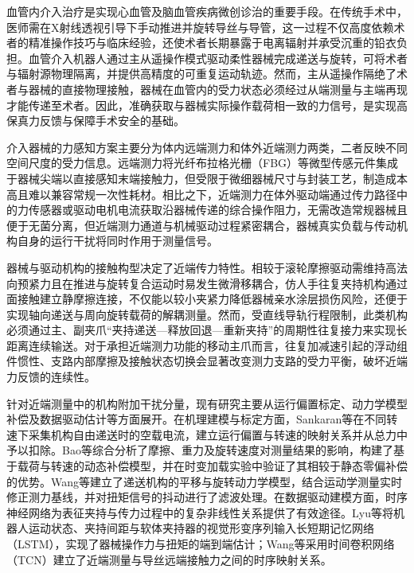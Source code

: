 \documentclass{JQRnew}
\begin{document}
\maketitle

血管内介入治疗是实现心血管及脑血管疾病微创诊治的重要手段。在传统手术中，医师需在X射线透视引导下手动推进并旋转导丝与导管，这一过程不仅高度依赖术者的精准操作技巧与临床经验，还使术者长期暴露于电离辐射并承受沉重的铅衣负担。血管介入机器人通过主从遥操作模式驱动柔性器械完成递送与旋转，可将术者与辐射源物理隔离，并提供高精度的可重复运动轨迹。然而，主从遥操作隔绝了术者与器械的直接物理接触，器械在血管内的受力状态必须经过从端测量与主端再现才能传递至术者。因此，准确获取与器械实际操作载荷相一致的力信号，是实现高保真力反馈与保障手术安全的基础。

介入器械的力感知方案主要分为体内远端测力和体外近端测力两类，二者反映不同空间尺度的受力信息。远端测力将光纤布拉格光栅（FBG）等微型传感元件集成于器械尖端以直接感知末端接触力，但受限于微细器械尺寸与封装工艺，制造成本高且难以兼容常规一次性耗材。相比之下，近端测力在体外驱动端通过传力路径中的力传感器\cite{ref4,ref6}或驱动电机电流\cite{ref5}获取沿器械传递的综合操作阻力，无需改造常规器械且便于无菌分离，但近端测力通道与机械驱动过程紧密耦合，器械真实负载与传动机构自身的运行干扰将同时作用于测量信号。


器械与驱动机构的接触构型决定了近端传力特性。相较于滚轮摩擦驱动需维持高法向预紧力且在推进与旋转复合运动时易发生微滑移耦合，仿人手往复夹持机构通过面接触建立静摩擦连接，不仅能以较小夹紧力降低器械亲水涂层损伤风险，还便于实现轴向递送与周向旋转载荷的解耦测量。然而，受直线导轨行程限制，此类机构必须通过主、副夹爪“夹持递送---释放回退---重新夹持”的周期性往复接力来实现长距离连续输送。对于承担近端测力功能的移动主爪而言，往复加减速引起的浮动组件惯性、支路内部摩擦及接触状态切换会显著改变测力支路的受力平衡，破坏近端力反馈的连续性。

针对近端测量中的机构附加干扰分量，现有研究主要从运行偏置标定、动力学模型补偿及数据驱动估计等方面展开。在机理建模与标定方面，Sankaran等在不同转速下采集机构自由递送时的空载电流，建立运行偏置与转速的映射关系并从总力中予以扣除。Bao等综合分析了摩擦、重力及旋转速度对测量结果的影响，构建了基于载荷与转速的动态补偿模型，并在时变加载实验中验证了其相较于静态零偏补偿的优势。Wang等建立了递送机构的平移与旋转动力学模型，结合运动学测量实时修正测力基线，并对扭矩信号的抖动进行了滤波处理。在数据驱动建模方面，时序神经网络为表征夹持与传力过程中的复杂非线性关系提供了有效途径。Lyu等将机器人运动状态、夹持间距与软体夹持器的视觉形变序列输入长短期记忆网络（LSTM），实现了器械操作力与扭矩的端到端估计；Wang等采用时间卷积网络（TCN）建立了近端测量与导丝远端接触力之间的时序映射关系。
\end{document}
